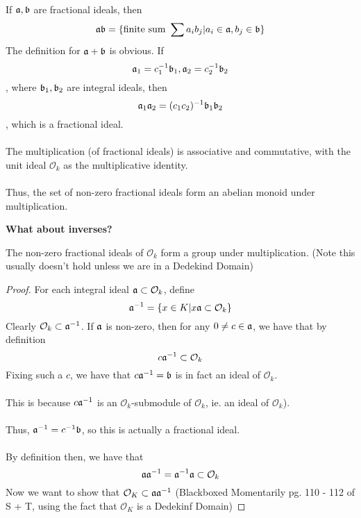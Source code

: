 \begin{definition}
If $\mathfrak{a}, \mathfrak{b}$ are fractional ideals, then 
\[\mathfrak{a} \mathfrak{b} = \{\text{finite sum } \sum a_i b_j | a_i \in \mathfrak{a}, b_j \in \mathfrak{b}\}\]
The definition for $\mathfrak{a} + \mathfrak{b}$ is obvious. If
\[\mathfrak{a}_1 = c_1^{-1} \mathfrak{b}_1, \mathfrak{a}_2 = c_2^{-1} \mathfrak{b}_2\]
, where $\mathfrak{b}_1, \mathfrak{b}_2$ are integral ideals, then
\[\mathfrak{a}_1 \mathfrak{a}_2 = (c_1c_2)^{-1} \mathfrak{b}_1 \mathfrak{b}_2\]
, which is a fractional ideal.\\\\
The multiplication (of fractional ideals) is associative and commutative, with the unit ideal $\mathcal{O}_k$ as the multiplicative identity.\\\\
Thus, the set of non-zero fractional ideals form an abelian monoid under multiplication.
\end{definition}

\noindent \textbf{What about inverses?}

\begin{theorem}[pg. 109 of S+T]
The non-zero fractional ideals of $\mathcal{O}_k$ form a group under multiplication. (Note this usually doesn't hold unless we are in a Dedekind Domain)
\end{theorem}

\begin{proof}
For each integral ideal $\mathfrak{a} \subset \mathcal{O}_k$, define
\[\mathfrak{a}^{-1} = \{x \in K | x \mathfrak{a} \subset \mathcal{O}_k\}\]
Clearly $\mathcal{O}_k \subset \mathfrak{a}^{-1}$. If $\mathfrak{a}$ is non-zero, then for any $0 \neq c \in \mathfrak{a}$, we have that by definition
\[c\mathfrak{a}^{-1} \subset \mathcal{O}_k\]
Fixing such a $c$, we have that $c \mathfrak{a}^{-1} = \mathfrak{b}$ is in fact an ideal of $\mathcal{O}_k$.\\\\
This is because $c \mathfrak{a}^{-1}$ is an $\mathcal{O}_k$-submodule of $\mathcal{O}_k$, ie. an ideal of $\mathcal{O}_k$).\\\\
Thus, $\mathfrak{a}^{-1} = c^{-1} \mathfrak{b}$, so this is actually a fractional ideal.\\\\
By definition then, we have that
\[\mathfrak{a} \mathfrak{a}^{-1} = \mathfrak{a}^{-1} \mathfrak{a} \subset \mathcal{O}_k\]
Now we want to show that $\mathcal{O}_K \subset \mathfrak{a} \mathfrak{a}^{-1}$ (Blackboxed Momentarily pg. 110 - 112 of S + T, using the fact that $\mathcal{O}_K$ is a Dedekinf Domain)
\end{proof}

